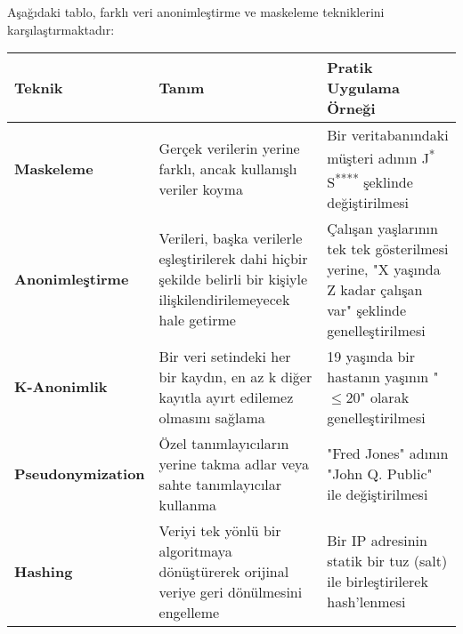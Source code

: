 Aşağıdaki tablo, farklı veri anonimleştirme ve maskeleme tekniklerini karşılaştırmaktadır:

\begin{tabular}{|l|l|l|}
\hline
Teknik & Tanım & Pratik Uygulama Örneği \\
\hline
\textbf{Maskeleme} & Gerçek verilerin yerine farklı, ancak kullanışlı veriler koyma & Bir veritabanındaki müşteri adının J\textsuperscript{*} S\textsuperscript{****} şeklinde değiştirilmesi \\
\hline
\textbf{Anonimleştirme} & Verileri, başka verilerle eşleştirilerek dahi hiçbir şekilde belirli bir kişiyle ilişkilendirilemeyecek hale getirme & Çalışan yaşlarının tek tek gösterilmesi yerine, "X yaşında Z kadar çalışan var" şeklinde genelleştirilmesi \\
\hline
\textbf{K-Anonimlik} & Bir veri setindeki her bir kaydın, en az k diğer kayıtla ayırt edilemez olmasını sağlama & 19 yaşında bir hastanın yaşının "$\le 20$" olarak genelleştirilmesi \\
\hline
\textbf{Pseudonymization} & Özel tanımlayıcıların yerine takma adlar veya sahte tanımlayıcılar kullanma & "Fred Jones" adının "John Q. Public" ile değiştirilmesi \\
\hline
\textbf{Hashing} & Veriyi tek yönlü bir algoritmaya dönüştürerek orijinal veriye geri dönülmesini engelleme & Bir IP adresinin statik bir tuz (salt) ile birleştirilerek hash'lenmesi \\
\hline
\end{tabular}